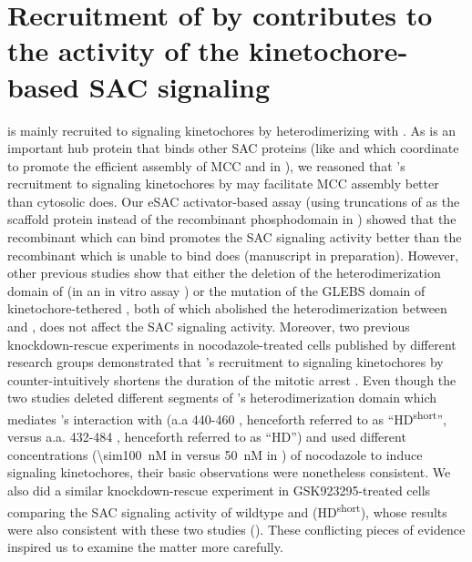 \section{Recruitment of  by   contributes to the activity of the kinetochore-based SAC signaling}
\label{per_se}

 is mainly recruited to signaling kinetochores by heterodimerizing with  \cite{BubBiochem,BubR1TwoPools}. As  is an important hub protein that binds other SAC proteins (like  and  which coordinate to promote the efficient assembly of MCC  and in  \cite{BUB1-CDC20-MAD1,Tripartite}), we reasoned that 's recruitment to signaling kinetochores by  may facilitate MCC assembly better than cytosolic  does. Our eSAC activator-based assay (using truncations of  as the scaffold protein instead of the recombinant  phosphodomain in ) showed that the recombinant  which can bind  promotes the SAC signaling activity better than the recombinant  which is unable to bind  does (manuscript in preparation). However, other previous studies show that either the deletion of the heterodimerization domain of  (in an in vitro assay \cite{BUB1-CDC20-MAD1}) or the mutation of the GLEBS domain of kinetochore-tethered  \cite{MIS12-BUB1-E252K}, both of which abolished the heterodimerization between  and , does not affect the SAC signaling activity. Moreover, two previous  knockdown-rescue experiments in nocodazole-treated cells published by different research groups demonstrated that 's recruitment to signaling kinetochores by  counter-intuitively shortens the duration of the mitotic arrest \cite{BubR1TwoPools,BubBiochem}. Even though the two studies deleted different segments of 's heterodimerization domain which mediates 's interaction with  (a.a 440-460 \cite{BubR1TwoPools}, henceforth referred to as ``HD\textsuperscript{short}'', versus a.a. \textDelta{}432-484 \cite{BubBiochem}, henceforth referred to as ``HD'') and used different concentrations (\SI{\sim100}{nM} in \cite{BubR1TwoPools} versus \SI{50}{nM} in \cite{BubBiochem}) of nocodazole to induce signaling kinetochores, their basic observations were nonetheless consistent. We also did a similar knockdown-rescue experiment in GSK923295-treated cells comparing the SAC signaling activity of wildtype  and (\textDelta{}HD\textsuperscript{short}), whose results were also consistent with these two studies (). These conflicting pieces of evidence inspired us to examine the matter more carefully.

